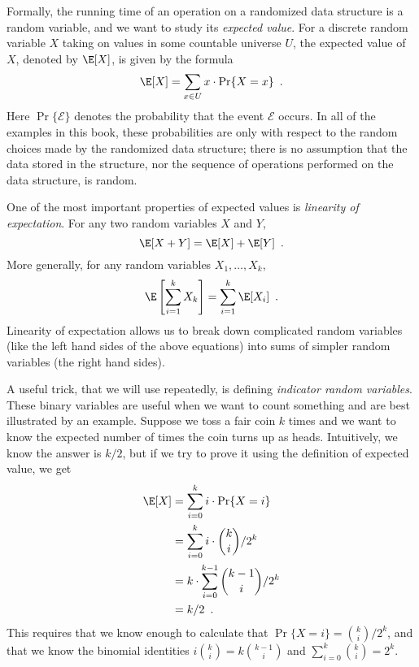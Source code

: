 Formally, the running time of an operation on a randomized data structure
is a random variable, and we want to study its \emph{expected value}.
%
For
a discrete random variable $X$ taking on values in some countable
universe $U$, the expected value of $X$, denoted by $\E[X]$, is given
by the formula
\[
    \E[X] = \sum_{x\in U} x\cdot\Pr\{X=x\} \enspace .
\]
Here $\Pr\{\mathcal{E}\}$ denotes the probability that the event
$\mathcal{E}$ occurs.  In all of the examples in this book, these
probabilities are only with respect to the random choices made by the
randomized data structure;  there is no assumption that the data stored
in the structure, nor the sequence of operations performed on the
data structure, is random.

One of the most important properties of expected values is \emph{linearity
of expectation}.
%
For any two random variables $X$ and $Y$,
\[
   \E[X+Y] = \E[X] + \E[Y] \enspace .
\]
More generally, for any random variables $X_1,\ldots,X_k$,
\[
   \E\left[\sum_{i=1}^k X_k\right] = \sum_{i=1}^k \E[X_i] \enspace .
\]
Linearity of expectation allows us to break down complicated random variables (like the left hand sides of the above equations) into sums of simpler random variables (the right hand sides).

A useful trick, that we will use repeatedly, is defining \emph{indicator
random variables}.
%
These binary variables are useful when we want to
count something and are best illustrated by an example.  Suppose we toss
a fair coin $k$ times and we want to know the expected number of times
the coin turns up as heads.
%
Intuitively, we know the answer is $k/2$,
but if we try to prove it using the definition of expected value, we get
\begin{align*}
   \E[X] & = \sum_{i=0}^k i\cdot\Pr\{X=i\} \\
         & = \sum_{i=0}^k i\cdot\binom{k}{i}/2^k \\
         & = k\cdot \sum_{i=0}^{k-1}\binom{k-1}{i}/2^k \\
         & = k/2 \enspace .
\end{align*}
This requires that we know enough to calculate that $\Pr\{X=i\}
= \binom{k}{i}/2^k$, and that we know the binomial identities
$i\binom{k}{i}=k\binom{k-1}{i}$ and $\sum_{i=0}^{k} \binom{k}{i} = 2^{k}$.

